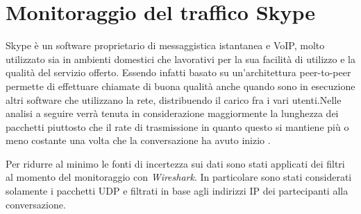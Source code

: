 \chapter{Monitoraggio del traffico Skype}

Skype è un software proprietario di messaggistica istantanea e VoIP, molto utilizzato sia in ambienti domestici che lavorativi per la sua facilità di utilizzo e la qualità del servizio offerto. Essendo infatti basato su un'architettura peer-to-peer permette di effettuare chiamate di buona qualità anche quando sono in esecuzione altri software che utilizzano la rete, distribuendo il carico fra i vari utenti.\newline Nelle analisi a seguire verrà tenuta in considerazione maggiormente la lunghezza dei pacchetti piuttosto che il rate di trasmissione in quanto questo si mantiene più o meno costante una volta che la conversazione ha avuto inizio \cite{bibitem3}.\newline\newline

Per ridurre al minimo le fonti di incertezza sui dati sono stati applicati dei filtri al momento del monitoraggio con \emph{Wireshark}. In particolare sono stati considerati solamente i pacchetti UDP e filtrati in base agli indirizzi IP dei partecipanti alla conversazione.

